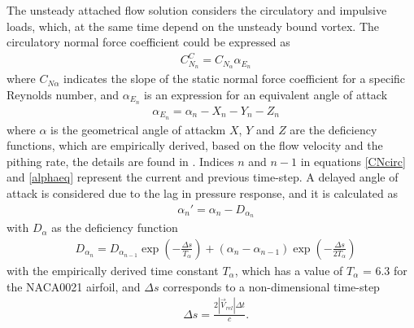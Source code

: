 \documentclass[a4paper]{jpconf}
\begin{document}
The unsteady attached flow solution considers the circulatory and impulsive loads, which, at the same time depend on the unsteady bound vortex. The circulatory normal force coefficient could be expressed as
\begin{align}
& C_{N_n}^C = C_{N_\alpha} \alpha_{E_n}	\label{CNcirc}
\end{align}
where $C_{N \alpha}$ indicates the slope of the static normal force coefficient for a specific Reynolds number, and $\alpha_{E_n}$ is an expression for an equivalent angle of attack
\begin{align}
& \alpha_{E_n} = \alpha_n - X_n -Y_n - Z_n	\label{alphaeq}
\end{align}
where $\alpha$ is the geometrical angle of attackm $X$, $Y$ and $Z$ are the deficiency functions, which are empirically derived, based on the flow velocity and the pithing rate, the details are found in \cite{dyachuk2013dynamic}. Indices $n$ and $n-1$ in equations \ref{CNcirc} and \ref{alphaeq} represent the current and previous time-step. A delayed angle of attack is considered due to the lag in pressure response, and it is calculated as
\begin{align}
& {\alpha _n}' = {\alpha _n} - D_{\alpha _n}    	\label{alphadel}
\end{align}
with $D_\alpha$ as the deficiency function
\begin{align}
& D_{\alpha_n} = D_{\alpha_{n-1}} \exp \left( - \frac{\Delta s}{T_\alpha} \right) + (\alpha_n - \alpha_{n-1})\exp \left( - \frac{\Delta s}{2T_\alpha} \right) \label{defalpha}
\end{align}
with the empirically derived time constant $T_\alpha$, which has a value of $T_\alpha$ = 6.3 for the NACA0021 airfoil, and $\Delta s$ corresponds to a non-dimensional time-step
\begin{align}
& \Delta s = \frac{2 | \vec{V}_{rel} | \Delta t}{c}		.	\label{deltas}
\end{align}
\end{document}
